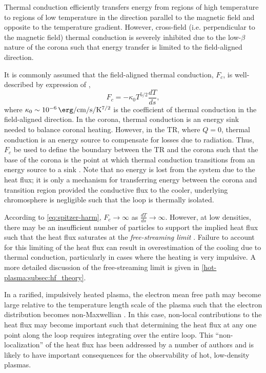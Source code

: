 Thermal conduction efficiently transfers energy from regions of high temperature to regions of low temperature in the direction parallel to the magnetic field and opposite to the temperature gradient. However, cross-field (i.e. perpendicular to the magnetic field) thermal conduction is severely inhibited due to the low-$\beta$ nature of the corona such that energy transfer is limited to the field-aligned direction. 

It is commonly assumed that the field-aligned thermal conduction, $F_c$, is well-described by expression of \citet{spitzer_transport_1953},
\begin{equation}\label{eq:spitzer-harm}
    F_c = -\kappa_0 T^{5/2} \frac{dT}{ds},
\end{equation}
where $\kappa_0\sim\SI{e-6}{\erg\per\cm\per\second\per\kelvin\tothe{7/2}}$ is the coefficient of thermal conduction in the field-aligned direction. In the corona, thermal conduction is an energy sink needed to balance coronal heating. However, in the TR, where $Q=0$, thermal conduction is an energy source to compensate for losses due to radiation. Thus, $F_c$ be used to define the boundary between the TR and the corona such that the base of the corona is the point at which thermal conduction transitions from an energy source to a sink \citep{vesecky_numerical_1979,bradshaw_new_2010}. Note that no energy is lost from the system due to the heat flux; it is only a mechanism for transferring energy between the corona and transition region provided the conductive flux to the cooler, underlying chromosphere is negligible such that the loop is thermally isolated.  

According to \autoref{eq:spitzer-harm}, $F_c\to\infty$ as $\frac{dT}{ds}\to\infty$. However, at low densities, there may be an insufficient number of particles to support the implied heat flux such that the heat flux saturates at the \textit{free-streaming limit} \citep{patsourakos_coronal_2005,bradshaw_explosive_2006,bradshaw_collisional_2013}. Failure to account for this limiting of the heat flux can result in overestimation of the cooling due to thermal conduction, particularly in cases where the heating is very impulsive. A more detailed discussion of the free-streaming limit is given in \autoref{hot-plasma:subsec:hf_theory}.

In a rarified, impulsively heated plasma, the electron mean free path may become large relative to the temperature length scale of the plasma such that the electron distribution becomes non-Maxwellian \citep{bradshaw_collisional_2013}. In this case, non-local contributions to the heat flux may become important such that determining the heat flux at any one point along the loop requires integrating over the entire loop. This ``non-localization'' of the heat flux has been addressed by a number of authors \citep{ljepojevic_heat_1989,karpen_nonlocal_1987,luciani_nonlocal_1983,west_lifetime_2008} and is likely to have important consequences for the observability of hot, low-density plasmas.

